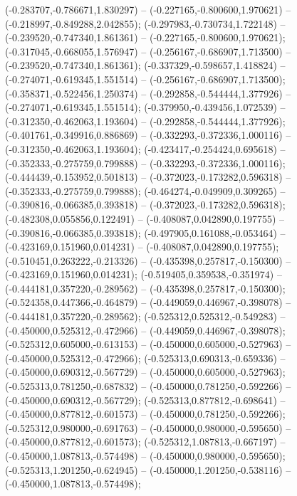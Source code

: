  (-0.283707,-0.786671,1.830297) -- (-0.227165,-0.800600,1.970621) -- (-0.218997,-0.849288,2.042855);
 (-0.297983,-0.730734,1.722148) -- (-0.239520,-0.747340,1.861361) -- (-0.227165,-0.800600,1.970621);
 (-0.317045,-0.668055,1.576947) -- (-0.256167,-0.686907,1.713500) -- (-0.239520,-0.747340,1.861361);
 (-0.337329,-0.598657,1.418824) -- (-0.274071,-0.619345,1.551514) -- (-0.256167,-0.686907,1.713500);
 (-0.358371,-0.522456,1.250374) -- (-0.292858,-0.544444,1.377926) -- (-0.274071,-0.619345,1.551514);
 (-0.379950,-0.439456,1.072539) -- (-0.312350,-0.462063,1.193604) -- (-0.292858,-0.544444,1.377926);
 (-0.401761,-0.349916,0.886869) -- (-0.332293,-0.372336,1.000116) -- (-0.312350,-0.462063,1.193604);
 (-0.423417,-0.254424,0.695618) -- (-0.352333,-0.275759,0.799888) -- (-0.332293,-0.372336,1.000116);
 (-0.444439,-0.153952,0.501813) -- (-0.372023,-0.173282,0.596318) -- (-0.352333,-0.275759,0.799888);
 (-0.464274,-0.049909,0.309265) -- (-0.390816,-0.066385,0.393818) -- (-0.372023,-0.173282,0.596318);
 (-0.482308,0.055856,0.122491) -- (-0.408087,0.042890,0.197755) -- (-0.390816,-0.066385,0.393818);
 (-0.497905,0.161088,-0.053464) -- (-0.423169,0.151960,0.014231) -- (-0.408087,0.042890,0.197755);
 (-0.510451,0.263222,-0.213326) -- (-0.435398,0.257817,-0.150300) -- (-0.423169,0.151960,0.014231);
 (-0.519405,0.359538,-0.351974) -- (-0.444181,0.357220,-0.289562) -- (-0.435398,0.257817,-0.150300);
 (-0.524358,0.447366,-0.464879) -- (-0.449059,0.446967,-0.398078) -- (-0.444181,0.357220,-0.289562);
 (-0.525312,0.525312,-0.549283) -- (-0.450000,0.525312,-0.472966) -- (-0.449059,0.446967,-0.398078);
 (-0.525312,0.605000,-0.613153) -- (-0.450000,0.605000,-0.527963) -- (-0.450000,0.525312,-0.472966);
 (-0.525313,0.690313,-0.659336) -- (-0.450000,0.690312,-0.567729) -- (-0.450000,0.605000,-0.527963);
 (-0.525313,0.781250,-0.687832) -- (-0.450000,0.781250,-0.592266) -- (-0.450000,0.690312,-0.567729);
 (-0.525313,0.877812,-0.698641) -- (-0.450000,0.877812,-0.601573) -- (-0.450000,0.781250,-0.592266);
 (-0.525312,0.980000,-0.691763) -- (-0.450000,0.980000,-0.595650) -- (-0.450000,0.877812,-0.601573);
 (-0.525312,1.087813,-0.667197) -- (-0.450000,1.087813,-0.574498) -- (-0.450000,0.980000,-0.595650);
 (-0.525313,1.201250,-0.624945) -- (-0.450000,1.201250,-0.538116) -- (-0.450000,1.087813,-0.574498);
